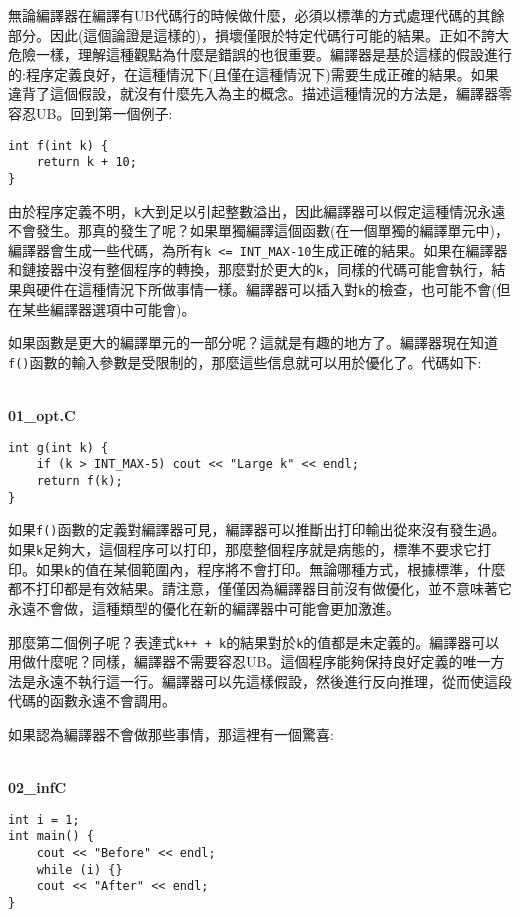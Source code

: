 無論編譯器在編譯有UB代碼行的時候做什麼，必須以標準的方式處理代碼的其餘部分。因此(這個論證是這樣的)，損壞僅限於特定代碼行可能的結果。正如不誇大危險一樣，理解這種觀點為什麼是錯誤的也很重要。編譯器是基於這樣的假設進行的:程序定義良好，在這種情況下(且僅在這種情況下)需要生成正確的結果。如果違背了這個假設，就沒有什麼先入為主的概念。描述這種情況的方法是，編譯器零容忍UB。回到第一個例子:

\begin{lstlisting}[style=styleCXX]
int f(int k) {
	return k + 10;
}
\end{lstlisting}

由於程序定義不明，\texttt{k}大到足以引起整數溢出，因此編譯器可以假定這種情況永遠不會發生。那真的發生了呢？如果單獨編譯這個函數(在一個單獨的編譯單元中)，編譯器會生成一些代碼，為所有\texttt{k <= INT\_MAX-10}生成正確的結果。如果在編譯器和鏈接器中沒有整個程序的轉換，那麼對於更大的\texttt{k}，同樣的代碼可能會執行，結果與硬件在這種情況下所做事情一樣。編譯器可以插入對\texttt{k}的檢查，也可能不會(但在某些編譯器選項中可能會)。

如果函數是更大的編譯單元的一部分呢？這就是有趣的地方了。編譯器現在知道\texttt{f()}函數的輸入參數是受限制的，那麼這些信息就可以用於優化了。代碼如下:

\hspace*{\fill} \\ %
\noindent
\textbf{01\_opt.C}
\begin{lstlisting}[style=styleCXX]
int g(int k) {
	if (k > INT_MAX-5) cout << "Large k" << endl;
	return f(k);
}
\end{lstlisting}

如果\texttt{f()}函數的定義對編譯器可見，編譯器可以推斷出打印輸出從來沒有發生過。如果\texttt{k}足夠大，這個程序可以打印，那麼整個程序就是病態的，標準不要求它打印。如果\texttt{k}的值在某個範圍內，程序將不會打印。無論哪種方式，根據標準，什麼都不打印都是有效結果。請注意，僅僅因為編譯器目前沒有做優化，並不意味著它永遠不會做，這種類型的優化在新的編譯器中可能會更加激進。

那麼第二個例子呢？表達式\texttt{k++ + k}的結果對於\texttt{k}的值都是未定義的。編譯器可以用做什麼呢？同樣，編譯器不需要容忍UB。這個程序能夠保持良好定義的唯一方法是永遠不執行這一行。編譯器可以先這樣假設，然後進行反向推理，從而使這段代碼的函數永遠不會調用。

如果認為編譯器不會做那些事情，那這裡有一個驚喜:

\hspace*{\fill} \\ %
\noindent
\textbf{02\_infC}
\begin{lstlisting}[style=styleCXX]
int i = 1;
int main() {
	cout << "Before" << endl;
	while (i) {}
	cout << "After" << endl;
}
\end{lstlisting}

